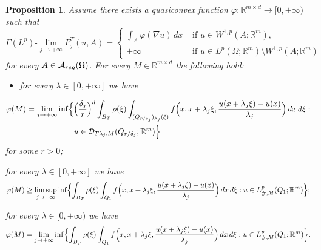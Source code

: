 \documentclass[10pt,a4paper]{amsart}
\newtheorem{proposition}{Proposition}
\newcommand{\A}{\mathcal{A}}
\newcommand{\R}{\mathbb{R}}
\newcommand{\dej}{\delta_j}
\newcommand{\f}{\varphi}
\begin{document}
\begin{proposition}\label{prop : cell formula}
    Assume there exists a quasiconvex function $\varphi: \R^{m\times d}\to[0,+\infty)$ such that 
\begin{equation*}
     \Gamma(L^p)\text{-}\lim_{j\to+\infty} F^T_j(u,A) = \begin{cases}
            \displaystyle \int_{A} \f(\nabla u)\,dx & \text{ if } u\in W^{1,p}(A;\R^m), \\
            +\infty & \text{ if } u\in L^p(\Omega;\R^m)\setminus W^{1,p}(A;\R^m)
        \end{cases}
\end{equation*}
for every $A\in\A_{\rm reg}(\Omega)$. For every $M\in\R^{m\times d}$ the following hold:
\begin{itemize}
    \item[(i)]  for every $\lambda\in[0,+\infty]$ we have
\end{itemize}\begin{align*}
    \f(M) & = \lim_{j\to+\infty} \inf\Bigl\{ \Bigl(\frac{\dej}{r}\Bigr)^d\int_{B_T} \rho(\xi)\int_{(Q_{r/\dej})_{\lambda_j}(\xi)} f\Bigl(x, x+\lambda_j\xi, \frac{u(x+\lambda_j\xi)-u(x)}{\lambda_j}\Bigr)\, dx\,d\xi : \\
    & \qquad \qquad \qquad u\in \mathcal{D}_{T\lambda_j,M}(Q_{r/\dej};\R^m) \Bigr\}
\end{align*}
for some $r>0$;
\item[(ii)] for every $\lambda\in[0,+\infty]$ we have 
\begin{equation*}
    \f(M) \geq \limsup_{j\to+\infty} \inf\Bigl\{ \int_{B_T} \rho(\xi)\int_{Q_1} f\Bigl(x,x+\lambda_j\xi,\frac{u(x+\lambda_j\xi)-u(x)}{\lambda_j}\Bigr)\, dx\,d\xi : u\in L^p_{\#,M}(Q_1;\R^m) \Bigr\};
\end{equation*}
\item[(iii)] for every $\lambda\in[0,+\infty)$ we have
\begin{equation*}
    \f(M) = \lim_{j\to+\infty} \inf\Bigl\{ \int_{B_T} \rho(\xi)\int_{Q_1} f\Bigl(x,x+\lambda_j\xi,\frac{u(x+\lambda_j\xi)-u(x)}{\lambda_j}\Bigr)\, dx\,d\xi : u\in L^p_{\#,M}(Q_1;\R^m) \Bigr\}.
\end{equation*}
\end{proposition}
\end{document}
